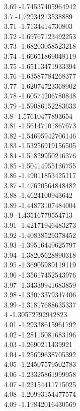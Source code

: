 {3.69	-1.74537405964942\\
3.7	-1.72934213538889\\
3.71	-1.7134414730803\\
3.72	-1.69767123492253\\
3.73	-1.68203058523218\\
3.74	-1.66651869048119\\
3.75	-1.65113471933394\\
3.76	-1.63587784268377\\
3.77	-1.62074723368902\\
3.78	-1.60574206780848\\
3.79	-1.59086152283633\\
3.8	-1.57610477893654\\
3.81	-1.56147101867673\\
3.82	-1.54695942706146\\
3.83	-1.53256919156505\\
3.84	-1.51829950216376\\
3.85	-1.50414955136755\\
3.86	-1.49011853425117\\
3.87	-1.47620564848482\\
3.88	-1.4624100943642\\
3.89	-1.44873107484004\\
3.9	-1.43516779554713\\
3.91	-1.42171946483273\\
3.92	-1.40838529378452\\
3.93	-1.39516449625797\\
3.94	-1.38205628890318\\
3.95	-1.36905989119119\\
3.96	-1.35617452543976\\
3.97	-1.34339941683859\\
3.98	-1.33073379347406\\
3.99	-1.31817688635337\\
4	-1.30572792942823\\
4.01	-1.29338615961792\\
4.02	-1.28115081683196\\
4.03	-1.2690211439921\\
4.04	-1.25699638705392\\
4.05	-1.24507579502783\\
4.06	-1.23325861999958\\
4.07	-1.22154411715025\\
4.08	-1.20993154477574\\
4.09	-1.19842016430569\\
}
